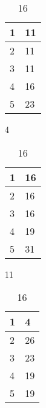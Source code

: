 \documentclass{scrartcl}
\begin{document}
\begin{table}[!htb]
	\begin{minipage}[t]{.33\linewidth}
		\centering
			\begin{tabular}{|l|l|}
				\hline
				1 & 11 \\ \hline
				2 & 11 \\ \hline
				3 & 11 \\ \hline
				4 & 16 \\ \hline
				5 & 23 \\ \hline
			\end{tabular}
		\caption{4}
	\end{minipage}%
	\hfill%
	\begin{minipage}[t]{.33\linewidth}
		\centering
		\begin{tabular}{|l|l|}
			\hline
			1 & 16 \\ \hline
			2 & 16 \\ \hline
			3 & 16 \\ \hline
			4 & 19 \\ \hline
			5 & 31 \\ \hline
		\end{tabular}
		\caption{11}
	\end{minipage}%
	\hfill%
	\begin{minipage}[t]{.33\linewidth}
		\centering
		\begin{tabular}{|l|l|}
			\hline
			1 & 4 \\ \hline
			2 & 26 \\ \hline
			3 & 23 \\ \hline
			4 & 19 \\ \hline
			5 & 19 \\ \hline
		\end{tabular}
		\caption{16}
\end{minipage}
\end{table}
\end{document}
